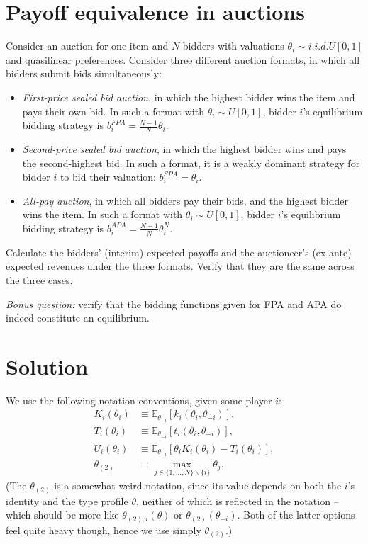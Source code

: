 \documentclass[a4paper]{article}
\newif\ifsolutions
\begin{document}
\fi



\section{Payoff equivalence in auctions}

Consider an auction for one item and $N$ bidders with valuations $\theta_i \sim i.i.d.U[0,1]$ and quasilinear preferences. Consider three different auction formats, in which all bidders submit bids simultaneously:
\begin{itemize}
	\item \emph{First-price sealed bid auction}, in which the highest bidder wins the item and pays their own bid. In such a format with $\theta_i \sim U[0,1]$, bidder $i$'s equilibrium bidding strategy is $b_i^{FPA} = \frac{N-1}{N} \theta_i$.
	\item \emph{Second-price sealed bid auction}, in which the highest bidder wins and pays the second-highest bid. In such a format, it is a weakly dominant strategy for bidder $i$ to bid their valuation: $b_i^{SPA} = \theta_i$.
	\item \emph{All-pay auction}, in which all bidders pay their bids, and the highest bidder wins the item. In such a format with $\theta_i \sim U[0,1]$, bidder $i$'s equilibrium bidding strategy is $b_i^{APA} = \frac{N-1}{N} \theta_i^N$.
\end{itemize}
Calculate the bidders' (interim) expected payoffs and the auctioneer's (ex ante) expected revenues under the three formats. Verify that they are the same across the three cases.

\emph{Bonus question:} verify that the bidding functions given for FPA and APA do indeed constitute an equilibrium.

\ifsolutions
\section*{Solution}

We use the following notation conventions, given some player $i$:
\begin{align*}
	K_i(\theta_i) &\equiv \mathbb{E}_{\theta_{-i}} \left[ k_i(\theta_i,\theta_{-i}) \right],
	\\
	T_i(\theta_i) &\equiv \mathbb{E}_{\theta_{-i}} \left[ t_i(\theta_i,\theta_{-i}) \right],
	\\
	\bar{U}_i(\theta_i) &\equiv \mathbb{E}_{\theta_{-i}} \left[ \theta_i K_i(\theta_i) - T_i(\theta_i) \right],
	\\
	\theta_{(2)} &\equiv \max_{j \in \{1,...,N\} \backslash \{i\}} \theta_j .
\end{align*}
(The $\theta_{(2)}$ is a somewhat weird notation, since its value depends on both the $i$'s identity and the type profile $\theta$, neither of which is reflected in the notation -- which should be more like $\theta_{(2),i}(\theta)$ or $\theta_{(2)}(\theta_{-i})$. Both of the latter options feel quite heavy though, hence we use simply $\theta_{(2)}$.)
\end{document}

